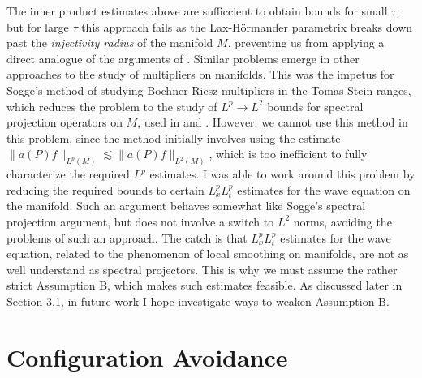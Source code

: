 \documentclass[11pt]{article}
\begin{document}
The inner product estimates above are sufficcient to obtain bounds for small $\tau$, but for large $\tau$ this approach fails as the Lax-H\"{o}rmander parametrix breaks down past the \emph{injectivity radius} of the manifold $M$, preventing us from applying a direct analogue of the arguments of \cite{HeoNazarovSeeger}. Similar problems emerge in other approaches to the study of multipliers on manifolds. This was the impetus for Sogge's method of studying Bochner-Riesz multipliers in the Tomas Stein ranges, which reduces the problem to the study of $L^p \to L^2$ bounds for spectral projection operators on $M$, used in \cite{SoggeRieszMeans} and \cite{KimManifold}. %
However, we cannot use this method in this problem, since the method initially involves using the estimate $\| a(P) f \|_{L^p(M)} \lesssim \| a(P) f \|_{L^2(M)}$, which is too inefficient to fully characterize the required $L^p$ estimates.
I was able to work around this problem by reducing the required bounds to certain $L^p_x L^p_t$ estimates for the wave equation on the manifold. Such an argument behaves somewhat like Sogge's spectral projection argument, but does not involve a switch to $L^2$ norms, avoiding the problems of such an approach. The catch is that $L^p_x L^p_t$ estimates for the wave equation, related to the phenomenon of local smoothing on manifolds, are not as well understand as spectral projectors. This is why we must assume the rather strict Assumption B, which makes such estimates feasible. As discussed later in Section 3.1, in future work I hope investigate ways to weaken Assumption B.


\section{Configuration Avoidance} \label{Section2}
\end{document}
